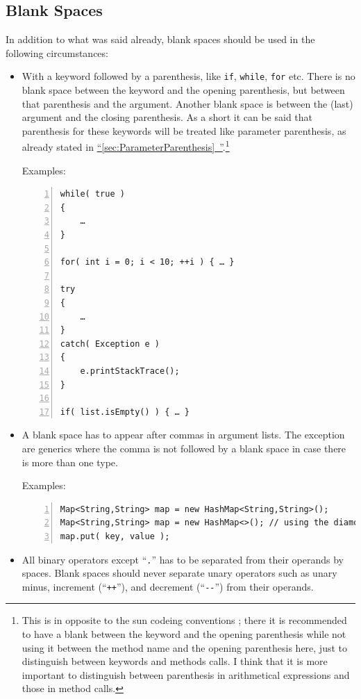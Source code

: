 \documentclass[11pt,a4paper, titlepage, parskip=half, headsepline, footsepline, cleardoublepage=current, headheight=1cm]{scrbook}
\newcommand*{\tqfullref}[1]{\hyperref[{#1}]{“\ref*{#1}~\nameref*{#1}”}}
\begin{document}
\subsection{Blank Spaces}\label{sec:BlankSpaces}
In addition to what was said already, blank spaces should be used in the following circumstances:
\begin{itemize}
\item{With a keyword followed by a parenthesis, like \lstinline|if|, \lstinline|while|, \lstinline|for| etc. There is no blank space between the keyword and the opening parenthesis, but  between that parenthesis and the argument. Another blank space is between the (last) argument and the closing parenthesis. As a short it can be said that parenthesis for these keywords will be treated like parameter parenthesis, as already stated in \tqfullref{sec:ParameterParenthesis}.\footnote{This is in opposite to the sun codeing conventions \autocite{SUN_CODE_CONVENTIONS}; there it is recommended to have a blank between the keyword and the opening parenthesis while not using it between the method name and the opening parenthesis here, just to distinguish between keywords and methods calls. I think that it is more important to distinguish between parenthesis in arithmetical expressions and those in method calls.}

Examples:
\begin{lstlisting}[numbers=left]
while( true )
{
    …
}

for( int i = 0; i < 10; ++i ) { … }

try
{
    …
}
catch( Exception e )
{
    e.printStackTrace();
}

if( list.isEmpty() ) { … }
\end{lstlisting}}
\item{A blank space has to appear after commas in argument lists. The exception are generics where the comma is not followed by a blank space in case there is more than one type.

Examples:
\begin{lstlisting}[numbers=left]
Map<String,String> map = new HashMap<String,String>();
Map<String,String> map = new HashMap<>(); // using the diamond operator
map.put( key, value );
\end{lstlisting}}
\item{All binary operators except “\verb#.#” has to be separated from their operands by spaces. Blank spaces should never separate unary operators such as unary minus, increment (“\verb#++#”), and decrement (“\verb#--#”) from their operands.

}
\end{itemize}
\end{document}
